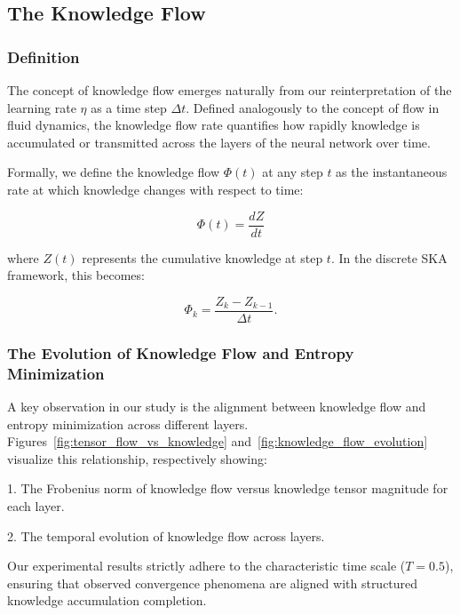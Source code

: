 \documentclass{article}
\begin{document}
	\subsection{The Knowledge Flow}
	
	\subsubsection{Definition}
	
	
	The concept of knowledge flow  emerges naturally from our reinterpretation of the learning rate \( \eta \) as a time step \( \Delta t \). Defined analogously to the concept of flow in fluid dynamics, the knowledge flow rate quantifies how rapidly knowledge is accumulated or transmitted across the layers of the neural network over time.
	
	Formally, we define the knowledge flow \( \Phi(t) \) at any step \( t \) as the instantaneous rate at which knowledge changes with respect to time:
	
	\begin{equation}
		\Phi(t) = \frac{dZ}{dt}
	\end{equation}
	
	where \( Z(t) \) represents the cumulative knowledge at step \( t \). In the discrete SKA framework, this becomes:
	
	\begin{equation}
		\Phi_k = \frac{Z_{k} - Z_{k-1}}{\Delta t}.
	\end{equation}
	
	
	
	\subsubsection{The Evolution of Knowledge Flow and Entropy Minimization}
	
	A key observation in our study is the alignment between knowledge flow and entropy minimization across different layers. Figures~\ref{fig:tensor_flow_vs_knowledge} and~\ref{fig:knowledge_flow_evolution} visualize this relationship, respectively showing:
	
	1. The Frobenius norm of knowledge flow versus knowledge tensor  magnitude for each layer.
	
	2. The temporal evolution of knowledge flow across layers.
	
	Our experimental results strictly adhere to the characteristic time scale ($T = 0.5$), ensuring that observed convergence phenomena are aligned with structured knowledge accumulation completion.
	
\end{document}
